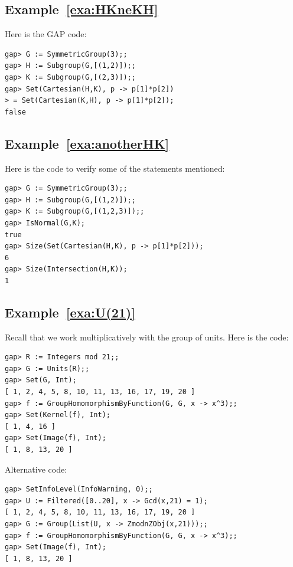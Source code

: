 \subsection*{Example~\ref{exa:HKneKH}}

Here is the GAP code:
\begin{lstlisting}
gap> G := SymmetricGroup(3);;
gap> H := Subgroup(G,[(1,2)]);;
gap> K := Subgroup(G,[(2,3)]);;
gap> Set(Cartesian(H,K), p -> p[1]*p[2])
> = Set(Cartesian(K,H), p -> p[1]*p[2]);
false
\end{lstlisting}

\subsection*{Example~\ref{exa:anotherHK}}

Here is the code to verify some of the statements mentioned:
\begin{lstlisting}
gap> G := SymmetricGroup(3);;
gap> H := Subgroup(G,[(1,2)]);;
gap> K := Subgroup(G,[(1,2,3)]);;
gap> IsNormal(G,K);
true
gap> Size(Set(Cartesian(H,K), p -> p[1]*p[2]));
6
gap> Size(Intersection(H,K));
1
\end{lstlisting}

\subsection*{Example~\ref{exa:U(21)}}

Recall that we work multiplicatively with the group of units. Here is the code:
\begin{lstlisting}
gap> R := Integers mod 21;;
gap> G := Units(R);;
gap> Set(G, Int);
[ 1, 2, 4, 5, 8, 10, 11, 13, 16, 17, 19, 20 ]
gap> f := GroupHomomorphismByFunction(G, G, x -> x^3);;
gap> Set(Kernel(f), Int);
[ 1, 4, 16 ]
gap> Set(Image(f), Int);
[ 1, 8, 13, 20 ]
\end{lstlisting}
Alternative code:
\begin{lstlisting}
gap> SetInfoLevel(InfoWarning, 0);;
gap> U := Filtered([0..20], x -> Gcd(x,21) = 1);
[ 1, 2, 4, 5, 8, 10, 11, 13, 16, 17, 19, 20 ]
gap> G := Group(List(U, x -> ZmodnZObj(x,21)));;
gap> f := GroupHomomorphismByFunction(G, G, x -> x^3);;
gap> Set(Image(f), Int);
[ 1, 8, 13, 20 ]
\end{lstlisting}


